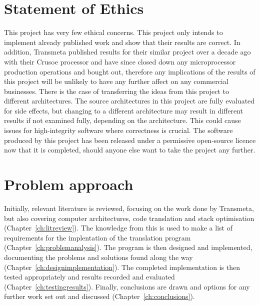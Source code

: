 \section{Statement of Ethics}
This project has very few ethical concerns. This project only intends to
implement already published work and show that their results are correct. In
addition, Transmeta published results for their similar project over a decade
ago with their Crusoe processor and have since closed down any microprocessor
production operations and bought out, therefore any implications of the results
of this project will be unlikely to have any further affect on any commercial
businesses. There is the case of transferring the ideas from this project to
different architectures. The source architectures in this project are fully
evaluated for side effects, but changing to a different architecture may result
in different results if not examined fully, depending on the architecture. This
could cause issues for high-integrity software where correctness is crucial. The
software produced by this project has been released under a permissive
open-source licence now that it is completed, should anyone else want to take
the project any further.

\section{Problem approach}
Initially, relevant literature is reviewed, focusing on the work done by
Transmeta, but also covering computer architectures, code translation and stack
optimisation (Chapter~\ref{ch:litreview}). The knowledge from this is used to
make a list of requirements for the implentation of the translation program
(Chapter~\ref{ch:problemanalysis}). The program is then designed and
implemented, documenting the problems and solutions found along the way
(Chapter~\ref{ch:designimplementation}). The completed implementation is then
tested appropriately and results recorded and evaluated
(Chapter~\ref{ch:testingresults}). Finally, conclusions are drawn and options
for any further work set out and discussed (Chapter~\ref{ch:conclusions}).
